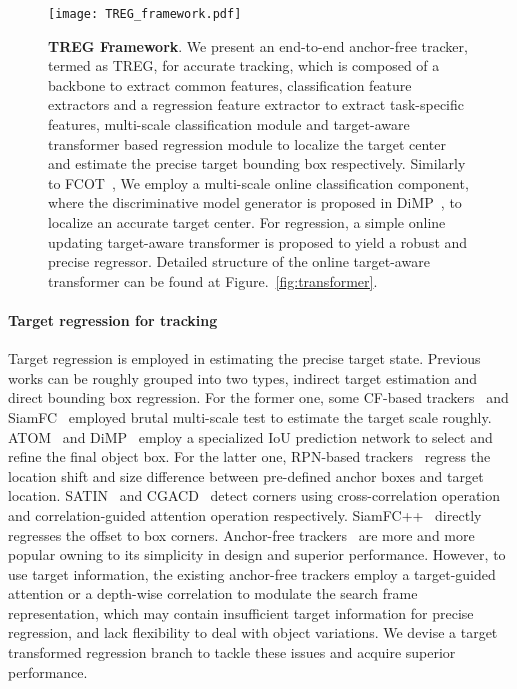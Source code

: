 \documentclass[10pt,twocolumn,letterpaper]{article}
\begin{document}
\begin{figure*}
\begin{center}
\texttt{[image: TREG\_framework.pdf]}
\end{center}
   \caption{{\bf TREG Framework}.
We present an end-to-end anchor-free tracker, termed as TREG, for accurate tracking, which is composed of a backbone to extract common features, classification feature extractors and a regression feature extractor to extract task-specific features, multi-scale classification module and target-aware transformer based regression module to localize the target center and estimate the precise target bounding box respectively.
Similarly to FCOT~\cite{fcot}, We employ a multi-scale online classification component, where the discriminative model generator is proposed in DiMP~\cite{dimp}, to localize an accurate target center. 
For regression, a simple online updating target-aware transformer is proposed to yield a robust and precise regressor. 
Detailed structure of the online target-aware transformer can be found at Figure.~\ref{fig:transformer}. }
\label{fig:architecture}
\vspace{-0.2cm}
\end{figure*}

\paragraph{Target regression for tracking} 
Target regression is employed in estimating the precise target state. Previous works can be roughly grouped into two types, indirect target estimation and direct bounding box regression. For the former one,
some CF-based trackers~\cite{kcf,eco,dcf_,mdnet} and SiamFC~\cite{siamfc} employed brutal multi-scale test to estimate the target scale roughly. ATOM~\cite{atom} and DiMP~\cite{dimp} employ a specialized IoU prediction network to select and refine the final object box. 
For the latter one,
RPN-based trackers~\cite{siamrpn,siamrpnPlus,dasiamrpn,siamDW,StructSiam,siammask} regress the location shift and size difference between pre-defined anchor boxes and target location. SATIN~\cite{SATIN} and CGACD~\cite{CGACD} detect corners using cross-correlation operation and correlation-guided attention operation respectively. SiamFC++~\cite{siamfc++} directly regresses the offset to box corners. Anchor-free trackers~\cite{siamban,siamcar,ocean,fcot} are more and more popular owning to its simplicity in design and superior performance. 
However, to use target information, the existing anchor-free trackers employ a target-guided attention or a depth-wise correlation to modulate the search frame representation, which may contain insufficient target information for precise regression, and lack flexibility to deal with object variations. We devise a target transformed regression branch to tackle these issues and acquire superior performance.
\end{document}
